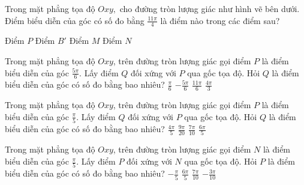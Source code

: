 \documentclass[12pt,a4paper]{article}
\begin{document}
\begin{ex}
 Trong mặt phẳng tọa độ ${Oxy},$ cho đường tròn lượng giác như hình vẽ bên dưới. Điểm biểu diễn của góc có số đo bằng $\frac{11 \pi}{4}$ là điểm nào trong các điểm sau? 
\begin{center}
\end{center}
\choice
{ Điểm ${{P}}$ }
   { Điểm ${{B'}}$ }
     { Điểm ${{M}}$ }
    { \True Điểm ${{N}}$ }
\end{ex}

\begin{ex}
   Trong mặt phẳng tọa độ ${Oxy}$, trên đường tròn lượng giác gọi điểm ${P}$ là điểm biểu diễn của góc $\frac{5 \pi}{6}$. Lấy điểm ${Q}$ đối xứng với ${P}$ qua gốc tọa độ. Hỏi ${Q}$ là điểm biểu diễn của góc có số đo bằng bao nhiêu? 
\choice
{ $\frac{\pi}{6}$ }
   { $- \frac{5 \pi}{6}$ }
     { \True $\frac{11 \pi}{6}$ }
    { $\frac{4 \pi}{3}$ }
\end{ex}

\begin{ex}
   Trong mặt phẳng tọa độ ${Oxy}$, trên đường tròn lượng giác gọi điểm ${P}$ là điểm biểu diễn của góc $\frac{\pi}{5}$. Lấy điểm ${Q}$ đối xứng với ${P}$ qua gốc tọa độ. Hỏi ${Q}$ là điểm biểu diễn của góc có số đo bằng bao nhiêu? 
\choice
{ $\frac{4 \pi}{5}$ }
   { $\frac{9 \pi}{20}$ }
     { $\frac{7 \pi}{10}$ }
    { \True $\frac{6 \pi}{5}$ }
\end{ex}

\begin{ex}
   Trong mặt phẳng tọa độ ${Oxy}$, trên đường tròn lượng giác gọi điểm ${N}$ là điểm biểu diễn của góc $\frac{\pi}{5}$. Lấy điểm ${P}$ đối xứng với ${N}$ qua gốc tọa độ. Hỏi ${P}$ là điểm biểu diễn của góc có số đo bằng bao nhiêu? 
\choice
{ $- \frac{\pi}{5}$ }
   { \True $\frac{6 \pi}{5}$ }
     { $\frac{7 \pi}{10}$ }
    { $- \frac{3 \pi}{10}$ }
\end{ex}
\end{document}
